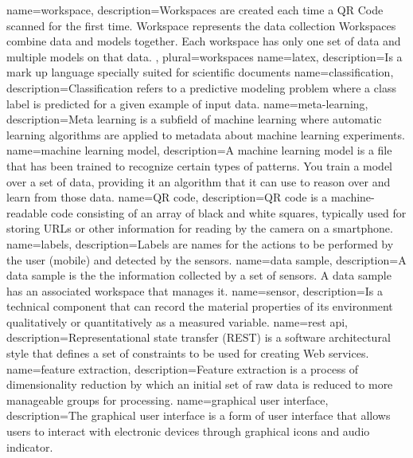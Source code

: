 {
    name={workspace},
    description={Workspaces are created each time a QR Code scanned for the first time. Workspace represents the data collection Workspaces combine data and models together. Each workspace has only one set of data and multiple models on that data.
    },
    plural={workspaces}
}
{
    name={latex},
    description={Is a mark up language specially suited for scientific documents}
}
{
    name={classification},
    description={Classification refers to a predictive modeling problem where a class label is predicted for a given example of input data.}
}
{
    name={meta-learning},
    description={Meta learning is a subfield of machine learning where automatic learning algorithms are applied to metadata about machine learning experiments.}
}
{
    name={machine learning model},
    description={A machine learning model is a file that has been trained to recognize certain types of patterns. You train a model over a set of data, providing it an algorithm that it can use to reason over and learn from those data.}
}
{
    name={QR code},
    description={QR code is a machine-readable code consisting of an array of black and white squares, typically used for storing URLs or other information for reading by the camera on a smartphone.}
}
{
    name={labels},
    description={Labels are names for the actions to be performed by the user (mobile) and detected by the sensors.}
}
{
    name={data sample},
    description={A data sample is the the information collected by a set of sensors. A data sample has an associated workspace that manages it.}
}
{
    name={sensor},
    description={Is a technical component that can record the material properties of its environment qualitatively or quantitatively as a measured variable.}
}
{
    name={rest api},
    description={Representational state transfer (REST) is a software architectural style that defines a set of constraints to be used for creating Web services.}
}
{
    name={feature extraction},
    description={Feature extraction is a process of dimensionality reduction by which an initial set of raw data is reduced to more manageable groups for processing.}
}
{
    name={graphical user interface},
    description={The graphical user interface is a form of user interface that allows users to interact with electronic devices through graphical icons and audio indicator.}
}
